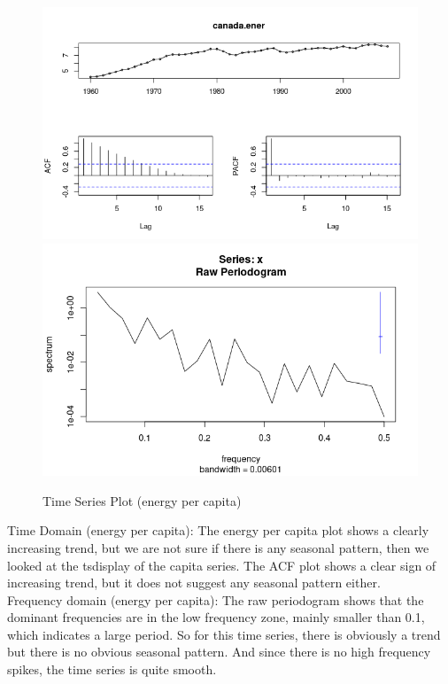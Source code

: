\documentclass[journal, a4paper]{IEEEtran}
\begin{document}
\begin{figure}[H]
\begin{center}
\includegraphics[scale=0.4]{fig2/tsdisplay_energy.png}
\includegraphics[scale=0.35]{fig2/period_energy.png}
\caption{Time Series Plot (energy per capita)}
\label{fig2:energy}
\end{center}
\end{figure}
Time Domain (energy per capita): The energy per capita plot shows a clearly increasing trend, but we are not sure if there is any seasonal pattern, then we looked at the tsdisplay of the capita series. The ACF plot shows a clear sign of increasing trend, but it does not suggest any seasonal pattern either.\\
Frequency domain (energy per capita): The raw periodogram shows that the dominant frequencies are in the low frequency zone, mainly smaller than 0.1, which indicates a large period. So for this time series, there is obviously a trend but there is no obvious seasonal pattern. And since there is no high frequency spikes, the time series is quite smooth.
\end{document}
